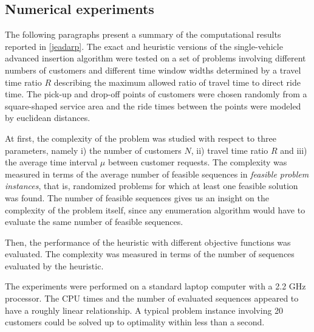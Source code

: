 \documentclass[dissertation,draft*]{aaltoseries}
\begin{document}
\subsection{Numerical experiments}
\label{svexperience}
The following paragraphs present a summary of the computational results reported in \ref{jeadarp}. 
The exact and heuristic versions of the single-vehicle advanced insertion algorithm
were tested on a set of problems involving different numbers of customers and different time
window widths determined by a travel time ratio $R$ describing the maximum allowed ratio of travel time
to direct ride time. The pick-up and drop-off points of customers were chosen randomly from a
square-shaped service area and the ride times between the points were modeled by euclidean distances.

At first, the complexity of the problem was studied with respect to three parameters, namely
i) the number of customers $N$, ii) travel time ratio $R$ and iii) the average time interval $\mu$
between customer requests. The complexity was measured in terms of the
average number of feasible sequences
in \emph{feasible problem instances}, that is, randomized
problems for which at least one feasible solution was found. 
The number of feasible sequences gives us an insight on the complexity of the problem itself,
since any enumeration algorithm would have to evaluate the same number of feasible sequences.

Then, the performance of the heuristic with different objective functions was evaluated.
The complexity was measured in terms of the number of sequences evaluated by the heuristic.

The experiments were performed on a standard laptop computer with a 2.2 GHz processor. 
The CPU times and the number of evaluated sequences appeared to have a roughly linear relationship.
A typical problem instance involving 20 customers could be solved up to optimality within less than a second.
\end{document}
